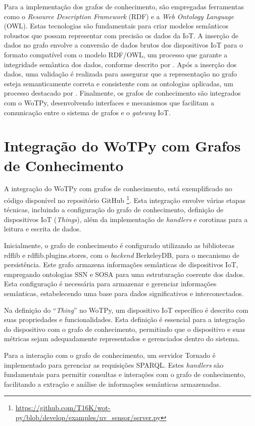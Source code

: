 Para a implementação dos grafos de conhecimento, são empregadas ferramentas como o \textit{Resource Description Framework} (RDF) e a \textit{Web Ontology Language} (OWL). Estas tecnologias são fundamentais para criar modelos semânticos robustos que possam representar com precisão os dados da IoT. A inserção de dados no grafo envolve a conversão de dados brutos dos dispositivos IoT para o formato compatível com o modelo RDF/OWL, um processo que garante a integridade semântica dos dados, conforme descrito por \cite{Antoniou2004}. Após a inserção dos dados, uma validação é realizada para assegurar que a representação no grafo esteja semanticamente correta e consistente com as ontologias aplicadas, um processo destacado por \cite{Corcho2003}. Finalmente, os grafos de conhecimento são integrados com o WoTPy, desenvolvendo interfaces e mecanismos que facilitam a comunicação entre o sistema de grafos e o \textit{gateway} IoT.

\section{Integração do WoTPy com Grafos de Conhecimento}

A integração do WoTPy com grafos de conhecimento, está exemplificado no código disponível no repositório GitHub \footnote{\url{https://github.com/T16K/wot-py/blob/develop/examples/uv_sensor/server.py}}. Esta integração envolve várias etapas técnicas, incluindo a configuração do grafo de conhecimento, definição de dispositivos IoT (\textit{Things}), além da implementação de \textit{handlers} e corotinas para a leitura e escrita de dados.

Inicialmente, o grafo de conhecimento é configurado utilizando as bibliotecas rdflib e rdflib.plugins.stores, com o \textit{backend} BerkeleyDB, para o mecanismo de persistência. Este grafo armazena informações semânticas de dispositivos IoT, empregando ontologias SSN e SOSA para uma estruturação coerente dos dados. Esta configuração é necessária para armazenar e gerenciar informações semânticas, estabelecendo uma base para dados significativos e interconectados.

Na definição do ``\textit{Thing}'' no WoTPy, um dispositivo IoT específico é descrito com suas propriedades e funcionalidades. Esta definição é essencial para a integração do dispositivo com o grafo de conhecimento, permitindo que o dispositivo e suas métricas sejam adequadamente representados e gerenciados dentro do sistema.

Para a interação com o grafo de conhecimento, um servidor Tornado é implementado para gerenciar as requisições SPARQL. Estes \textit{handlers} são fundamentais para permitir consultas e interações com o grafo de conhecimento, facilitando a extração e análise de informações semânticas armazenadas.

